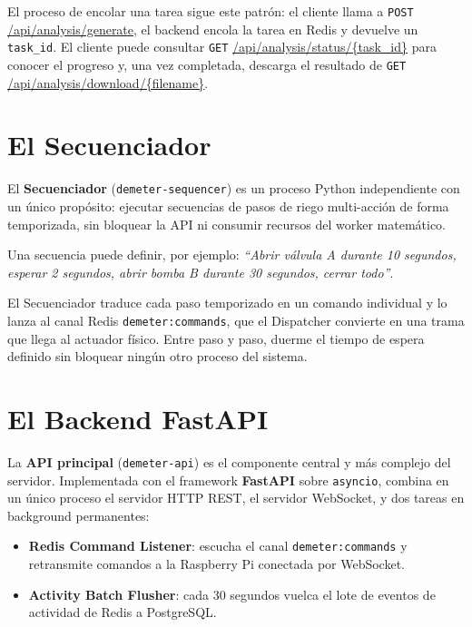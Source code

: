El proceso de encolar una tarea sigue este patrón: el cliente llama a \texttt{POST} \url{/api/analysis/generate}, el backend encola la tarea en Redis y devuelve un \texttt{task\_id}. El cliente puede consultar \texttt{GET} \url{/api/analysis/status/{task_id}} para conocer el progreso y, una vez completada, descarga el resultado de \texttt{GET} \url{/api/analysis/download/{filename}}.


\section{El Secuenciador}

El \textbf{Secuenciador} (\texttt{demeter-sequencer}) es un proceso Python independiente con 
un único propósito: ejecutar secuencias de pasos de riego multi-acción de forma temporizada, 
sin bloquear la API ni consumir recursos del worker matemático.

Una secuencia puede definir, por ejemplo: \textit{``Abrir válvula A durante 10 segundos, 
esperar 2 segundos, abrir bomba B durante 30 segundos, cerrar todo''}. 

El Secuenciador traduce cada paso temporizado en un comando individual y lo lanza al canal 
Redis \texttt{demeter:commands}, que el Dispatcher convierte en una trama que llega al 
actuador físico. Entre paso y paso, duerme el tiempo de espera definido sin bloquear 
ningún otro proceso del sistema.


\section{El Backend FastAPI}

La \textbf{API principal} (\texttt{demeter-api}) es el componente central y más complejo 
del servidor. Implementada con el framework \textbf{FastAPI} sobre \texttt{asyncio}, 
combina en un único proceso el servidor HTTP REST, el servidor WebSocket, 
y dos tareas en background permanentes:

\begin{itemize}[leftmargin=*, label=--]
    \item \textbf{Redis Command Listener}: escucha el canal \texttt{demeter:commands} y 
          retransmite comandos a la Raspberry Pi conectada por WebSocket.
    \item \textbf{Activity Batch Flusher}: cada 30 segundos vuelca el lote de 
          eventos de actividad de Redis a PostgreSQL.
\end{itemize}

